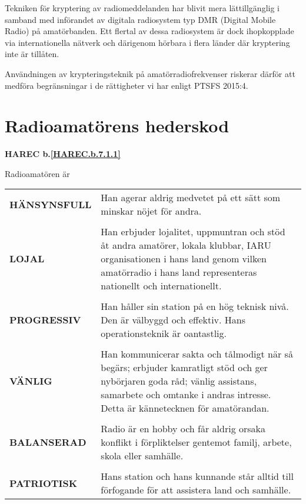 Tekniken för kryptering av radiomeddelanden har blivit mera lättillgänglig i
samband med införandet av digitala radiosystem typ DMR (Digital Mobile Radio) på
amatörbanden.
Ett flertal av dessa radiosystem är dock ihopkopplade via internationella
nätverk och därigenom hörbara i flera länder där kryptering inte är tillåten.

Användningen av krypteringsteknik på amatörradiofrekvenser riskerar därför att
medföra begränsningar i de rättigheter vi har enligt PTSFS 2015:4.

\section[Hederskod]{Radioamatörens hederskod}
\textbf{HAREC
  b.\ref{HAREC.b.7.1.1}\label{myHAREC.b.7.1.1}
}

Radioamatören är

\begin{tabular}{lp{9cm}}
  \textbf{HÄNSYNSFULL} &
     Han agerar aldrig medvetet på ett sätt som minskar nöjet för andra. \\
  & \\

  \textbf{LOJAL} &
  Han erbjuder lojalitet, uppmuntran och stöd åt andra amatörer, lokala klubbar,
  IARU organisationen i hans land genom vilken amatörradio i hans land
  representeras nationellt och internationellt.\\
  & \\

  \textbf{PROGRESSIV} &
  Han håller sin station på en hög teknisk nivå.
  Den är välbyggd och effektiv.
  Hans operationsteknik är oantastlig.\\
  & \\

  \textbf{VÄNLIG} &
  Han kommunicerar sakta och tålmodigt när så begärs;
  erbjuder kamratligt stöd och ger nybörjaren goda råd;
  vänlig assistans, samarbete och omtanke i andras intresse.
  Detta är kännetecknen för amatörandan.\\
  & \\

  \textbf{BALANSERAD} &
  Radio är en hobby och får aldrig orsaka konflikt i förpliktelser gentemot
  familj, arbete, skola eller samhälle.\\
  & \\

  \textbf{PATRIOTISK} &
  Hans station och hans kunnande står alltid till förfogande för att
  assistera land och samhälle.\\
\end{tabular}

